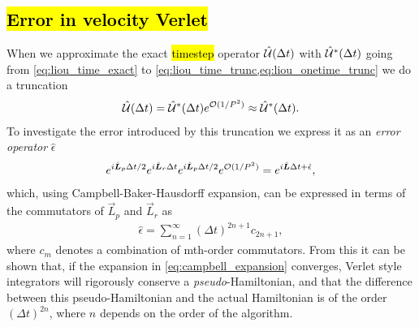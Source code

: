 \subsection[Error in velocity Verlet]{\hl{Error in velocity Verlet}\label{subsec:verlet_error_liouville}}
\newcommand{\errop}{\hat{\epsilon}}
When we approximate the exact \hl{timestep} operator $\hat{\mathcal{U}} (\Delta t)$ with $\hat{\mathcal{U}}^*(\Delta t)$ going from \cref{eq:liou_time_exact} to \cref{eq:liou_time_trunc,eq:liou_onetime_trunc} we do a truncation 
\begin{align*}
    \hat{\mathcal{U}}(\Delta t) = \hat{\mathcal{U}}^*(\Delta t) e^{\mathcal{O}(1/P^2)} \approx \hat{\mathcal{U}}^*(\Delta t).
\end{align*}
To investigate the error introduced by this truncation we express it as an \emph{error operator} $\errop$
\begin{align*}
    e^{\Liou_p\Delta t/2} e^{\Liou_r \Delta t} e^{\Liou_p \Delta t/2} e^{\mathcal{O}(1/P^2)}
    = e^{\Liou \Delta t + \errop},
\end{align*}
which, using Campbell-Baker-Hausdorff expansion, can be expressed in terms of the commutators of $\vec L_p$ and $\vec L_r$ as
\begin{align}
    \errop = \sum_{n=1}^\infty (\Delta t)^{2n+1} c_{2n+1},\label{eq:campbell_expansion}
\end{align}
where $c_m$ denotes a combination of mth-order commutators. %
From this it can be shown that, if the expansion in \cref{eq:campbell_expansion} converges, Verlet style integrators will rigorously conserve a \emph{pseudo}-Hamiltonian, and that the difference between this pseudo-Hamiltonian and the actual Hamiltonian is of the order $(\Delta t)^{2n}$, where $n$ depends on the order of the algorithm\cite[section 4.3.3]{frenkel2001understanding}.













